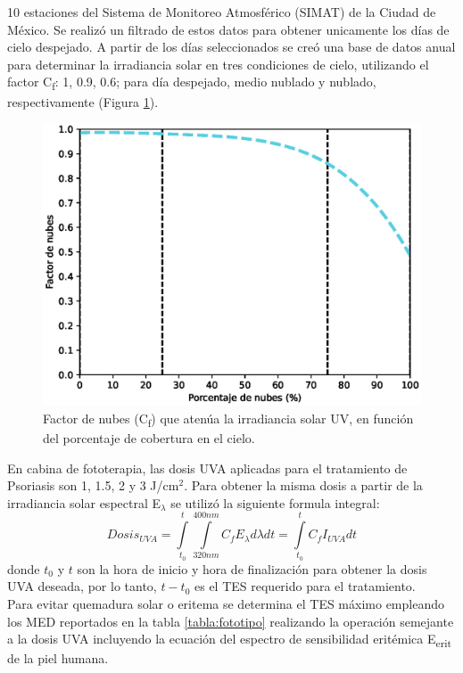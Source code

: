 \documentclass{article}
\begin{document}
\begin{multicols}{2}
 10 estaciones del Sistema de Monitoreo Atmosférico (SIMAT) de la Ciudad de México. Se realizó un filtrado de estos datos para
 obtener unicamente los días de cielo despejado. A partir de los días seleccionados se creó una base de datos anual para determinar
  la irradiancia solar en tres condiciones de cielo, utilizando el factor C\textsubscript{f}: 1, 0.9, 0.6; para día despejado, medio nublado y nublado, respectivamente
   (Figura \ref{fig:cloud}).
 \begin{figure}[H]
    \centering
    \includegraphics[scale=0.68]{images/cloud2.eps}
    \caption{Factor de nubes (C\textsubscript{f}) que atenúa la irradiancia solar UV, en
    función del porcentaje de cobertura en el cielo. }
    \label{fig:cloud}
\end{figure}
En cabina de fototerapia, las dosis UVA aplicadas para el tratamiento de Psoriasis son 1, 1.5, 2 y 3 J/cm$^2$. 
Para obtener la misma dosis a partir de la irradiancia solar espectral E$_\lambda$ se utilizó la siguiente formula integral:
\begin{equation*}
    Dosis_{UVA}=\int\limits_{t_0}^t\int\limits_{320nm}^{400nm} C_f E_{\lambda} d\lambda dt =\int\limits_{t_0}^{t} C_f I_{UVA}dt
\end{equation*}
donde $t_0$ y $t$ son la hora de inicio y hora de finalización para obtener la dosis UVA deseada, 
por lo tanto, $t-t_0$ es el TES requerido para el tratamiento.\\ Para evitar quemadura solar o eritema se determina el TES máximo 
empleando los MED reportados en la tabla \ref{tabla:fototipo} realizando la operación semejante a la dosis UVA incluyendo la ecuación del espectro de sensibilidad eritémica E\textsubscript{erit} de la piel humana.

\end{multicols}
\end{document}
